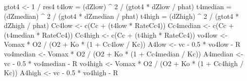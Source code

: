 \documentclass[
]{krantz}
\makeatletter
\newenvironment{Shaded}{\begin{snugshade}}{\end{snugshade}}
\newcommand{\DecValTok}[1]{\textcolor[rgb]{0.00,0.00,0.81}{#1}}
\newcommand{\FloatTok}[1]{\textcolor[rgb]{0.00,0.00,0.81}{#1}}
\newcommand{\FunctionTok}[1]{\textcolor[rgb]{0.00,0.00,0.00}{#1}}
\newcommand{\NormalTok}[1]{#1}
\newcommand{\OtherTok}[1]{\textcolor[rgb]{0.56,0.35,0.01}{#1}}
\newcommand{\SpecialCharTok}[1]{\textcolor[rgb]{0.00,0.00,0.00}{#1}}
\newenvironment{kframe}{%
\medskip{}
\setlength{\fboxsep}{.8em}
 \def\at@end@of@kframe{}%
 \ifinner\ifhmode%
  \def\at@end@of@kframe{\end{minipage}}%
  \begin{minipage}{\columnwidth}%
 \fi\fi%
 \def\FrameCommand##1{\hskip\@totalleftmargin \hskip-\fboxsep
 \colorbox{shadecolor}{##1}\hskip-\fboxsep
     \hskip-\linewidth \hskip-\@totalleftmargin \hskip\columnwidth}%
 \MakeFramed {\advance\hsize-\width
   \@totalleftmargin\z@ \linewidth\hsize
   \@setminipage}}%
 {\par\unskip\endMakeFramed%
 \at@end@of@kframe}
\renewenvironment{Shaded}{\begin{kframe}}{\end{kframe}}
\makeatother
\begin{document}
\begin{Shaded}
\begin{Highlighting}[]
\NormalTok{gtot4 }\OtherTok{\textless{}{-}} \DecValTok{1} \SpecialCharTok{/}\NormalTok{ res4}
\NormalTok{t4low }\OtherTok{=}\NormalTok{ (dZlow) }\SpecialCharTok{\^{}} \DecValTok{2} \SpecialCharTok{/}\NormalTok{ (gtot4 }\SpecialCharTok{*}\NormalTok{ dZlow }\SpecialCharTok{/}\NormalTok{ phat)}
\NormalTok{t4median }\OtherTok{=}\NormalTok{ (dZmedian) }\SpecialCharTok{\^{}} \DecValTok{2} \SpecialCharTok{/}\NormalTok{ (gtot4 }\SpecialCharTok{*}\NormalTok{ dZmedian }\SpecialCharTok{/}\NormalTok{ phat)}
\NormalTok{t4high }\OtherTok{=}\NormalTok{ (dZhigh) }\SpecialCharTok{\^{}} \DecValTok{2} \SpecialCharTok{/}\NormalTok{ (gtot4 }\SpecialCharTok{*}\NormalTok{ dZhigh }\SpecialCharTok{/}\NormalTok{ phat)}
\NormalTok{Cc4low }\OtherTok{\textless{}{-}} \FunctionTok{c}\NormalTok{(Cc }\SpecialCharTok{+}\NormalTok{ (t4low }\SpecialCharTok{*}\NormalTok{ RateCc4))}
\NormalTok{Cc4median }\OtherTok{\textless{}{-}} \FunctionTok{c}\NormalTok{(Cc }\SpecialCharTok{+}\NormalTok{ (t4median }\SpecialCharTok{*}\NormalTok{ RateCc4))}
\NormalTok{Cc4high }\OtherTok{\textless{}{-}} \FunctionTok{c}\NormalTok{(Cc }\SpecialCharTok{+}\NormalTok{ (t4high }\SpecialCharTok{*}\NormalTok{ RateCc4))}
\NormalTok{vo4low }\OtherTok{\textless{}{-}}\NormalTok{ Vomax }\SpecialCharTok{*}\NormalTok{ O2 }\SpecialCharTok{/}\NormalTok{ (O2 }\SpecialCharTok{+}\NormalTok{ Ko }\SpecialCharTok{*}\NormalTok{ (}\DecValTok{1} \SpecialCharTok{+}\NormalTok{ Cc4low }\SpecialCharTok{/}\NormalTok{ Kc)) }
\NormalTok{A4low }\OtherTok{\textless{}{-}}\NormalTok{ vc }\SpecialCharTok{{-}} \FloatTok{0.5} \SpecialCharTok{*}\NormalTok{ vo4low }\SpecialCharTok{{-}}\NormalTok{ R }
\NormalTok{vo4median }\OtherTok{\textless{}{-}}\NormalTok{ Vomax }\SpecialCharTok{*}\NormalTok{ O2 }\SpecialCharTok{/}\NormalTok{ (O2 }\SpecialCharTok{+}\NormalTok{ Ko }\SpecialCharTok{*}\NormalTok{ (}\DecValTok{1} \SpecialCharTok{+}\NormalTok{ Cc4median }\SpecialCharTok{/}\NormalTok{ Kc)) }
\NormalTok{A4median }\OtherTok{\textless{}{-}}\NormalTok{ vc }\SpecialCharTok{{-}} \FloatTok{0.5} \SpecialCharTok{*}\NormalTok{ vo4median }\SpecialCharTok{{-}}\NormalTok{ R }
\NormalTok{vo4high }\OtherTok{\textless{}{-}}\NormalTok{ Vomax }\SpecialCharTok{*}\NormalTok{ O2 }\SpecialCharTok{/}\NormalTok{ (O2 }\SpecialCharTok{+}\NormalTok{ Ko }\SpecialCharTok{*}\NormalTok{ (}\DecValTok{1} \SpecialCharTok{+}\NormalTok{ Cc4high }\SpecialCharTok{/}\NormalTok{ Kc)) }
\NormalTok{A4high }\OtherTok{\textless{}{-}}\NormalTok{ vc }\SpecialCharTok{{-}} \FloatTok{0.5} \SpecialCharTok{*}\NormalTok{ vo4high }\SpecialCharTok{{-}}\NormalTok{ R }


\end{Highlighting}
\end{Shaded}
\end{document}
